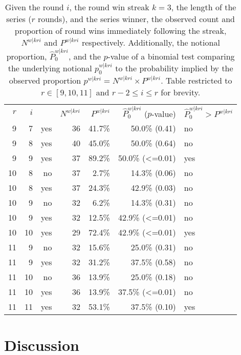 \documentclass{article}
\begin{document}
\begin{longtable}{rrrrrr}
\caption{Given the round $i$, the round win streak $k=3$, the length of the series ($r$ rounds), and the series winner, the observed count and proportion of round wins immediately following the streak, $N^{w|kri}$ and $P^{w|kri}$ respectively. Additionally, the notional proportion, $\hat{P}^{w|kri}_0$, and the $p$-value of a binomial test comparing the underlying notional $p^{w|kri}_0$ to the probability implied by the observed proportion $p^{w|kri} = N^{w|kri} \times P^{w|kri}$. Table restricted to $r \in [9, 10, 11]$ and $r - 2 \leq i \leq r$ for brevity.}
\label{tbl:cod-pw3ri-pl3ri} \\
\toprule
$r$ & $i$ &  & $N^{w|kri}$ & $P^{w|kri}$ & $\hat{P}^{w|kri}_0$ ($p$-value) & $\hat{P}^{w|kri}_0 > P^{w|kri}$ \\ 

9 & 7 & yes & 36 & 41.7\% & 50.0\% (0.41) & no \\ 
9 & 8 & yes & 40 & 45.0\% & 50.0\% (0.64) & no \\ 
9 & 9 & yes & 37 & 89.2\% & 50.0\% (<=0.01) & yes \\ 
10 & 8 & no & 37 & 2.7\% & 14.3\% (0.06) & no \\ 
10 & 8 & yes & 37 & 24.3\% & 42.9\% (0.03) & no \\ 
10 & 9 & no & 32 & 6.2\% & 14.3\% (0.31) & no \\ 
10 & 9 & yes & 32 & 12.5\% & 42.9\% (<=0.01) & no \\ 
10 & 10 & yes & 29 & 72.4\% & 42.9\% (<=0.01) & yes \\ 
11 & 9 & no & 32 & 15.6\% & 25.0\% (0.31) & no \\ 
11 & 9 & yes & 32 & 31.2\% & 37.5\% (0.58) & no \\ 
11 & 10 & no & 36 & 13.9\% & 25.0\% (0.18) & no \\ 
11 & 10 & yes & 36 & 13.9\% & 37.5\% (<=0.01) & no \\ 
11 & 11 & yes & 32 & 53.1\% & 37.5\% (0.10) & yes \\ 

\bottomrule
\end{longtable}

\hypertarget{discussion}{%
\section{Discussion}\label{discussion}}
\end{document}
